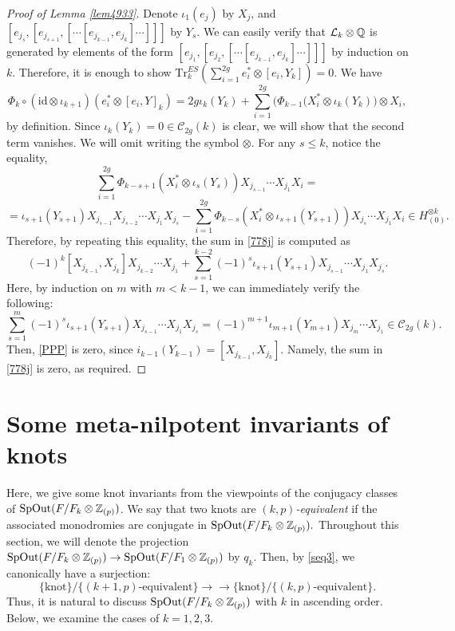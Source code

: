 \documentclass{article}
\theoremstyle{plain}
\theoremstyle{definition}
\newcommand{\lra}{\longrightarrow}
\newcommand{\ra}{\rightarrow}
\newcommand{\Q}{{\Bbb Q}}
\newcommand{\Z}{{\Bbb Z}}
\newcommand{\id}{{\mathrm{id}}}
\begin{document}
{\begin{proof}
[Proof of Lemma \ref{lem4933}] Denote $\iota_1(e_j)$ by $X_j$, and $[ e_{j_s}, [ e_{j_{s+1}}, [\cdots [ e_{j_{k-1}},e_{j_k} ] \cdots ]]]$ by $Y_s$. We can easily verify that $\mathcal{L}_k \otimes \Q$ is generated by elements of the form $[ e_{j_1}, [ e_{j_2}, [\cdots [ e_{j_{k-1}},e_{j_k} ] \cdots ]]]$ by induction on $k$. Therefore, it is enough to show $ \mathrm{Tr}_{k}^{ES} ( \sum_{i=1}^{2g} e_i^* \otimes [e_i, Y_k])=0. $ We have
\begin{equation}\label{778j}\Phi_k \circ ( \id \otimes \iota_{k+1})(e_i^* \otimes [e_i, Y]_k)=
2g \iota_{k}(Y_k)+ \sum_{i=1}^{2g}\bigl( \Phi_{k-1} ( X_i^* \otimes \iota_{k}( Y_k) \bigr) \otimes X_i ,
\end{equation}
by definition. Since $\iota_{k}(Y_k)=0 \in \mathcal{C}_{2g}(k) $ is clear, we will show that the second term vanishes. We will omit writing the symbol $\otimes.$ For any $s \leq k$, notice the equality,
\[ \sum_{i=1}^{2g}\Phi_{k-s+1} ( X_i^* \otimes \iota_{s}( Y_s )) X_{j_{s-1}} \cdots X_{j_{1}}X_i = \]
\[= \iota_{s+1}(Y_{s+1})X_{j_{s-1}}X_{j_{s-2}} \cdots X_{j_1} X_{j_s} -
\sum_{i=1}^{2g}\Phi_{k-s} ( X_i^* \otimes \iota_{s+1}( Y_{s+1}) )X_{j_s}\cdots X_{j_1} X_i \in H_{(0)}^{\otimes k}.\]
Therefore, by repeating this equality, the sum in \eqref{778j} is computed as
\begin{equation}\label{PPP}(-1)^{k}[X_{j_{k-1}} ,X_{j_k}] X_{j_{k-2}}\cdots X_{j_{1}}+
\sum_{s=1}^{k-2}(-1)^s
\iota_{s+1}( Y_{s+1})X_{j_{s-1}}\cdots X_{j_1}X_{j_s } . \end{equation}
Here, by induction on $m$ with $m < k-1$, we can immediately verify the following:
\[ \sum_{s=1}^{m}(-1)^s
\iota_{s+1}( Y_{s+1})X_{j_{s-1}}\cdots X_{j_1}X_{j_s }=(-1)^{m+1} \iota_{m+1}( Y_{m+1})X_{j_{m}}\cdots X_{j_1} \in \mathcal{C}_{2g}(k). \]
Then, \eqref{PPP} is zero, since $i_{k-1}(Y_{k-1})=[ X_{j_{k-1}} ,X_{j_k} ]$. Namely, the sum in \eqref{778j} is zero, as required.
\end{proof}

\section{Some meta-nilpotent invariants of knots}
\label{Seinv}
Here, we give some knot invariants from the viewpoints of the conjugacy classes of $\mathrm{SpOut}(F/F_k \otimes \Z_{(p)})$. We say that two knots are {\it $(k,p)$-equivalent} if the associated monodromies are conjugate in $\mathrm{SpOut}(F/F_k \otimes \Z_{(p)}).$ Throughout this section, we will denote the projection $\mathrm{SpOut}(F/F_k \otimes \Z_{(p)}) \ra \mathrm{SpOut}(F/F_1 \otimes \Z_{(p)})$ by $q_k.$ Then, by \eqref{seq3}, we canonically have a surjection:
\[\{ \textrm{knot}\}/\{(k+1,p) \textrm{-equivalent} \} \lra\!\!\!\!\! \ra \{ \textrm{knot}\}/\{(k ,p) \textrm{-equivalent} \} . \]
Thus, it is natural to discuss $\mathrm{SpOut}(F/F_k \otimes \Z_{(p)}) $ with $k$ in ascending order. Below, we examine the cases of $k=1,2,3$.

}
\end{document}
